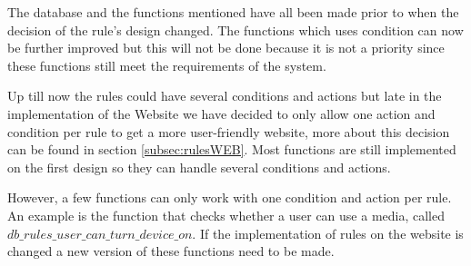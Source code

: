 The database and the functions mentioned have all been made prior to when the decision of the rule's design changed. The functions which uses condition can now be further improved but this will not be done because it is not a priority since these functions still meet the requirements of the system.

Up till now the rules could have several conditions and actions but late in the implementation of the Website we have decided to only allow one action and condition per rule to get a more user-friendly website, more about this decision can be found in section \vref{subsec:rulesWEB}. Most functions are still implemented on the first design so they can handle several conditions and actions. 

However, a few functions can only work with one condition and action per rule. An example is the function that checks whether a user can use a media, called $db\_rules\_user\_can\_turn\_device\_on$. If the implementation of rules on the website is changed a new version of these functions need to be made.
